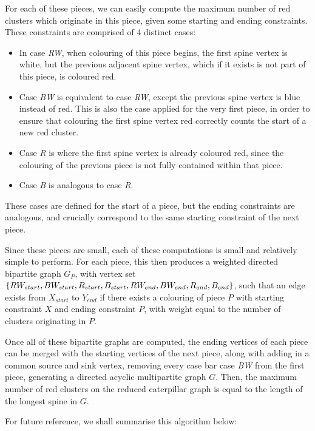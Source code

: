 \documentclass{mpaper}
\begin{document}
For each of these pieces, we can easily compute the maximum number of red clusters which originate in this piece, given some starting and ending constraints. These constraints are comprised of 4 distinct cases:

\begin{itemize}
  \item In case \emph{RW}, when colouring of this piece begins, the first spine vertex is white, but the previous adjacent spine vertex, which if it exists is not part of this piece, is coloured red.
  \item Case \emph{BW} is equivalent to case \emph{RW}, except the previous spine vertex is blue instead of red. This is also the case applied for the very first piece, in order to ensure that colouring the first spine vertex red correctly counts the start of a new red cluster.
  \item Case \emph{R} is where the first spine vertex is already coloured red, since the colouring of the previous piece is not fully contained within that piece.
  \item Case \emph{B} is analogous to case \emph{R}.
\end{itemize}

These cases are defined for the start of a piece, but the ending constraints are analogous, and crucially correspond to the same starting constraint of the next piece.

Since these pieces are small, each of these computations is small and relatively simple to perform. For each piece, this then produces a weighted directed bipartite graph $G_P$, with vertex set $\{RW_{start}, BW_{start}, R_{start}, B_{start}, \\ RW_{end}, BW_{end}, R_{end}, B_{end}\}$, such that an edge exists from $X_{start}$ to $Y_{end}$ if there exists a colouring of piece $P$ with starting constraint $X$ and ending constraint $P$, with weight equal to the number of clusters originating in $P$.

Once all of these bipartite graphs are computed, the ending vertices of each piece can be merged with the starting vertices of the next piece, along with adding in a common source and sink vertex, removing every case bar case \emph{BW} from the first piece, generating a directed acyclic multipartite graph $G$. Then, the maximum number of red clusters on the reduced caterpillar graph is equal to the length of the longest spine in $G$.

For future reference, we shall summarise this algorithm below:
\end{document}

